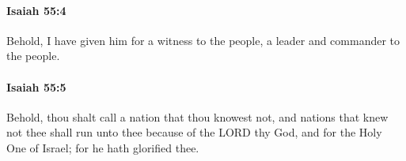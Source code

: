		\paragraph{Isaiah 55:4} %
			\label{ISAIAH-55-4}

			Behold, I have given him for a witness to the people, a leader and commander to the people.


		\paragraph{Isaiah 55:5} %
			\label{ISAIAH-55-5}

			Behold, thou shalt call a nation that thou knowest not, and nations that knew not thee shall run unto thee because of the LORD thy God, and for the Holy One of Israel; for he hath glorified thee.


